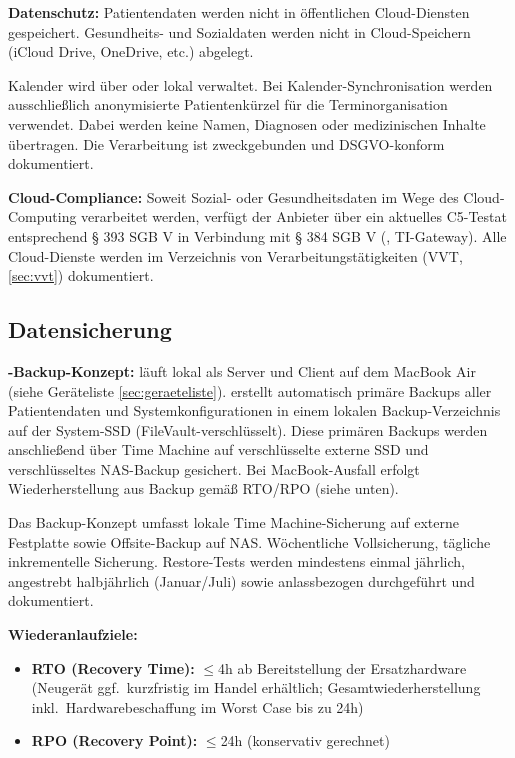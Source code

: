 \textbf{Datenschutz:} Patientendaten werden nicht in öffentlichen Cloud-Diensten gespeichert.
Gesundheits- und Sozialdaten werden nicht in Cloud-Speichern (iCloud Drive, OneDrive, etc.) abgelegt.

Kalender wird über \EmailAnbieter{} oder lokal verwaltet. Bei Kalender-Synchronisation werden
ausschließlich anonymisierte Patientenkürzel für die Terminorganisation verwendet.
Dabei werden keine Namen, Diagnosen oder medizinischen Inhalte übertragen.
Die Verarbeitung ist zweckgebunden und DSGVO-konform dokumentiert.

\textbf{Cloud-Compliance:} Soweit Sozial- oder Gesundheitsdaten im Wege des
Cloud-Computing verarbeitet werden, verfügt der Anbieter über ein aktuelles C5-Testat
entsprechend § 393 SGB V in Verbindung mit § 384 SGB V (\KIToolName{}, \PVSName{} TI-Gateway).
Alle Cloud-Dienste werden im Verzeichnis von Verarbeitungstätigkeiten (VVT, \cref{sec:vvt}) dokumentiert.

\subsection{Datensicherung}
\label{sec:datensicherung}

\textbf{\PVSName{}-Backup-Konzept:} \PVSName{} läuft lokal als Server und Client auf dem MacBook Air
(siehe Geräteliste \cref{sec:geraeteliste}). \PVSName{} erstellt automatisch primäre Backups aller
Patientendaten und Systemkonfigurationen in einem lokalen Backup-Verzeichnis auf der
System-SSD (FileVault-verschlüsselt).
Diese primären Backups werden anschließend über Time Machine auf verschlüsselte externe
SSD und verschlüsseltes NAS-Backup gesichert. Bei MacBook-Ausfall erfolgt Wiederherstellung
aus Backup gemäß RTO/RPO (siehe unten).

Das Backup-Konzept umfasst lokale Time Machine-Sicherung auf externe Festplatte sowie
Offsite-Backup auf NAS. Wöchentliche Vollsicherung, tägliche inkrementelle Sicherung.
Restore-Tests werden mindestens einmal jährlich, angestrebt halbjährlich (Januar/Juli)
sowie anlassbezogen durchgeführt und dokumentiert.

\textbf{Wiederanlaufziele:}
\begin{itemize}
  \item \textbf{RTO (Recovery Time):} $\leq$4h ab Bereitstellung der Ersatzhardware
    (Neugerät ggf.\ kurzfristig im Handel erhältlich; Gesamtwiederherstellung
    inkl.\ Hardwarebeschaffung im Worst Case bis zu 24h)
  \item \textbf{RPO (Recovery Point):} $\leq$24h (konservativ gerechnet)
\end{itemize}

